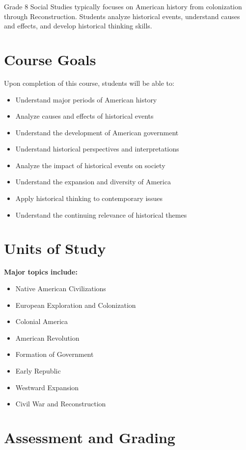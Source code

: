 \documentclass[11pt,letterpaper]{report}
\begin{document}
Grade 8 Social Studies typically focuses on American history from colonization through Reconstruction. Students analyze historical events, understand causes and effects, and develop historical thinking skills.

\section{Course Goals}

Upon completion of this course, students will be able to:

\begin{itemize}
    \item Understand major periods of American history
    \item Analyze causes and effects of historical events
    \item Understand the development of American government
    \item Understand historical perspectives and interpretations
    \item Analyze the impact of historical events on society
    \item Understand the expansion and diversity of America
    \item Apply historical thinking to contemporary issues
    \item Understand the continuing relevance of historical themes
\end{itemize}

\section{Units of Study}

\textbf{Major topics include:}
\begin{itemize}
    \item Native American Civilizations
    \item European Exploration and Colonization
    \item Colonial America
    \item American Revolution
    \item Formation of Government
    \item Early Republic
    \item Westward Expansion
    \item Civil War and Reconstruction
\end{itemize}

\section{Assessment and Grading}
\end{document}
